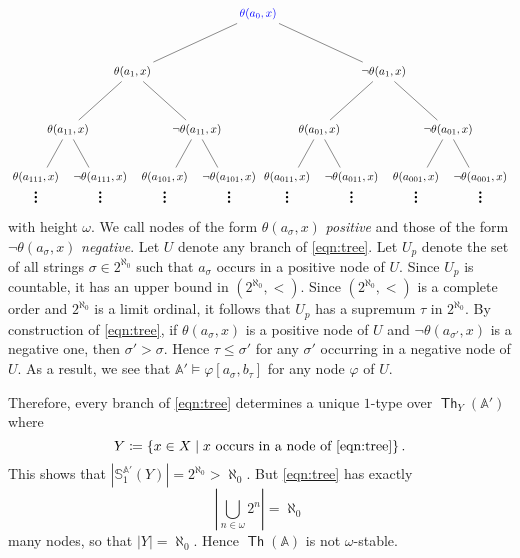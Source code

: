 \documentclass[10pt,letterpaper,cm]{nupset}
\theoremstyle{definition}
\theoremstyle{theorem}
\theoremstyle{remark}
\newcommand{\A}{\mathbb A}
\renewcommand{\S}{\mathbb S}
\newcommand{\1}{\mathbb{1}}
\newcommand{\0}{\vec 0}
\DeclareMathOperator{\thh}{\mathsf{Th}}
\begin{document}
\begin{solution}
\[\begin{tikzpicture}[level distance=1.8cm,
level 1/.style={sibling distance=7.8cm},
level 2/.style={sibling distance=4cm},
level 3/.style={sibling distance=2cm}]
\node (Root) [blue] {$\theta(a_0, x)$}
    child {
    node {$\theta(a_1, x)$} 
    child { node {$\theta(a_{11}, x)$}
    child { node { $\underset{\Huge\vdots}{\theta(a_{111},x)}$  }    }  child { node { $\underset{\Huge\vdots}{\neg{\theta(a_{111},x)}}$ }}}
    child { node {$\neg{\theta(a_{11}, x)}$} child { node { $\underset{\Huge\vdots}{\theta(a_{101},x)}$  }    }  child { node { $\underset{\Huge\vdots}{\neg{\theta(a_{101},x)}}$ }} }
}
child {
    node {$\neg{\theta(a_1, x)}$}
    child { node {$\theta(a_{01}, x)$} 
    child { node { $\underset{\Huge\vdots}{\theta(a_{011},x)}$  }    }  child { node { $\underset{\Huge\vdots}{\neg{\theta(a_{011},x)}}$ }}}
    child { node {$\neg{\theta(a_{01}, x)}$} 
    child { node { $\underset{\Huge\vdots}{\theta(a_{001},x)}$  }    }  child { node { $\underset{\Huge\vdots}{\neg{\theta(a_{001},x)}}$ }}}
};

\end{tikzpicture}
\] with height $\omega$. We call nodes of the form $\theta(a_{\sigma}, x)$ \textit{positive} and those of the form $\neg{\theta(a_{\sigma}, x)}$ \textit{negative}.  Let $U$ denote any branch of \eqref{eqn:tree}. Let $U_p$ denote the set of all strings $\sigma \in 2^{\aleph_0}$ such that $a_{\sigma}$ occurs in a positive node of $U$. Since $U_p$ is countable, it has an upper bound in $\left(2^{\aleph_0}, <\right)$. Since $\left(2^{\aleph_0}, <\right)$  is a complete order and  $2^{\aleph_0}$ is a limit ordinal, it follows that $U_p$ has a supremum $\tau$ in $2^{\aleph_0}$.  By construction of \eqref{eqn:tree}, if $\theta(a_{\sigma}, x)$ is a positive node of $U$ and $\neg{\theta(a_{\sigma'}, x)}$ is a negative one, then $\sigma' > \sigma$. Hence $\tau \leq \sigma'$ for any $\sigma'$ occurring in a negative node of $U$. As a result,  we see that $\A' \models \varphi[a_{\sigma}, b_{\tau}]$ for any node $\varphi$ of $U$.  

\smallskip

Therefore,  every branch of \eqref{eqn:tree} determines a unique $1$-type over $\thh_Y(\A')$ where $$Y \coloneqq \left\{x\in X \mid x \text{ occurs in a node of }\eqref{eqn:tree}\right\}.$$ This shows that $\left\lvert{\S_1^{\A'}(Y)}\right\rvert = 2^{\aleph_0} > \aleph_0$. But \eqref{eqn:tree} has exactly $$\left\lvert{\bigcup_{n\in \omega}2^n}\right\rvert = \aleph_0$$ many nodes, so that $\left\lvert{Y}\right\rvert = \aleph_0$. Hence $\thh(\A)$ is not $\omega$-stable. 

\end{solution}

\bigskip
\end{document}

